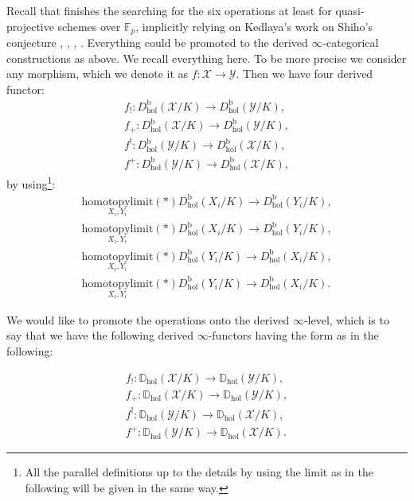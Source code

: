 \documentclass[11pt]{book}
\theoremstyle{definition}
\numberwithin{equation}{section}
\begin{document}
\indent Recall that \cite[Section 1.1.3]{Abe1} finishes the searching for the six operations at least for quasi-projective schemes over $\mathbb{F}_p$, implicitly relying on Kedlaya's work on Shiho's conjecture \cite{Ked4}, \cite{Ked5}, \cite{Ked6}, \cite{Ked7}. Everything could be promoted to the derived $\infty$-categorical constructions as above. We recall everything here. To be more precise we consider any morphism, which we denote it as $f:\mathcal{X}\rightarrow \mathcal{Y}$. Then we have four derived functor:
\begin{align}
f_!: D^\mathrm{b}_\mathrm{hol}(\mathcal{X}/K)\rightarrow D^\mathrm{b}_\mathrm{hol}(\mathcal{Y}/K),\\
f_+: D^\mathrm{b}_\mathrm{hol}(\mathcal{X}/K)\rightarrow D^\mathrm{b}_\mathrm{hol}(\mathcal{Y}/K),\\
f^!: D^\mathrm{b}_\mathrm{hol}(\mathcal{Y}/K)\rightarrow D^\mathrm{b}_\mathrm{hol}(\mathcal{X}/K),\\
f^+: D^\mathrm{b}_\mathrm{hol}(\mathcal{Y}/K)\rightarrow D^\mathrm{b}_\mathrm{hol}(\mathcal{X}/K),
\end{align}
by using\footnote{All the parallel definitions up to the details by using the limit as in the following will be given in the same way.}:
\begin{align}
\underset{X_i,Y_i}{\mathrm{homotopylimit}}(*) D^\mathrm{b}_\mathrm{hol}(X_i/K)\rightarrow D^\mathrm{b}_\mathrm{hol}(Y_i/K),\\
\underset{X_i,Y_i}{\mathrm{homotopylimit}}(*) D^\mathrm{b}_\mathrm{hol}(X_i/K)\rightarrow D^\mathrm{b}_\mathrm{hol}(Y_i/K),\\
\underset{X_i,Y_i}{\mathrm{homotopylimit}}(*) D^\mathrm{b}_\mathrm{hol}(Y_i/K)\rightarrow D^\mathrm{b}_\mathrm{hol}(X_i/K),\\
\underset{X_i,Y_i}{\mathrm{homotopylimit}}(*) D^\mathrm{b}_\mathrm{hol}(Y_i/K)\rightarrow D^\mathrm{b}_\mathrm{hol}(X_i/K).
\end{align}


\indent We would like to promote the operations onto the derived $\infty$-level, which is to say that we have the following derived $\infty$-functors having the form as in the following:

\begin{align}
f_!: \mathbb{D}_\mathrm{hol}(\mathcal{X}/K)\rightarrow \mathbb{D}_\mathrm{hol}(\mathcal{Y}/K),\\
f_+: \mathbb{D}_\mathrm{hol}(\mathcal{X}/K)\rightarrow \mathbb{D}_\mathrm{hol}(\mathcal{Y}/K),\\
f^!: \mathbb{D}_\mathrm{hol}(\mathcal{Y}/K)\rightarrow \mathbb{D}_\mathrm{hol}(\mathcal{X}/K),\\
f^+: \mathbb{D}_\mathrm{hol}(\mathcal{Y}/K)\rightarrow \mathbb{D}_\mathrm{hol}(\mathcal{X}/K).
\end{align}
\end{document}
